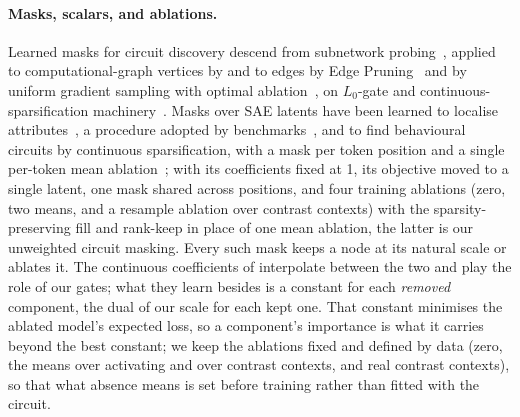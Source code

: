 \documentclass[10pt]{article}
\begin{document}
\paragraph{Masks, scalars, and ablations.}
Learned masks for circuit discovery descend from subnetwork probing~\citep{cao2021low}, applied to computational-graph vertices by \citet{conmy2023towards} and to edges by Edge Pruning~\citep{bhaskar2024finding} and by uniform gradient sampling with optimal ablation~\citep{li2024optimal}, on $L_0$-gate and continuous-sparsification machinery~\citep{louizos2018learning, savarese2020winning}.
Masks over SAE latents have been learned to localise attributes~\citep{chaudhary2024evaluating}, a procedure adopted by benchmarks~\citep{mueller2025mib, karvonen2025saebench}, and to find behavioural circuits by continuous sparsification, with a mask per token position and a single per-token mean ablation~\citep{caples2025scaling}; with its coefficients fixed at 1, its objective moved to a single latent, one mask shared across positions, and four training ablations (zero, two means, and a resample ablation over contrast contexts) with the sparsity-preserving fill and rank-keep in place of one mean ablation, the latter is our unweighted circuit masking.
Every such mask keeps a node at its natural scale or ablates it.
The continuous coefficients of \citet{li2024optimal} interpolate between the two and play the role of our gates; what they learn besides is a constant for each \emph{removed} component, the dual of our scale for each kept one.
That constant minimises the ablated model's expected loss, so a component's importance is what it carries beyond the best constant; we keep the ablations fixed and defined by data (zero, the means over activating and over contrast contexts, and real contrast contexts), so that what absence means is set before training rather than fitted with the circuit.
\end{document}

